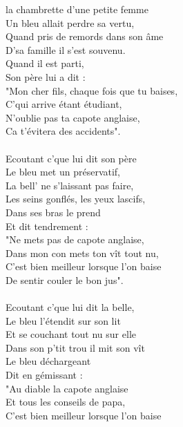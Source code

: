 
 la chambrette d'une petite femme
\\Un bleu allait perdre sa vertu,
\\Quand pris de remords dans son âme
\\D'sa famille il s'est souvenu.
\\Quand il est parti,
\\Son père lui a dit :
\\"Mon cher fils, chaque fois que tu baises,
\\C'qui arrive étant étudiant,
\\N'oublie pas ta capote anglaise,
\\Ca t'évitera des accidents".
\\\\Ecoutant c'que lui dit son père
\\Le bleu met un préservatif,
\\La bell' ne s'laissant pas faire,
\\Les seins gonflés, les yeux lascifs,
\\Dans ses bras le prend
\\Et dit tendrement :
\\"Ne mets pas de capote anglaise,
\\Dans mon con mets ton vît tout nu,
\\C'est bien meilleur lorsque l'on baise
\\De sentir couler le bon jus".
\\\\Ecoutant c'que lui dit la belle,
\\Le bleu l'étendit sur son lit
\\Et se couchant tout nu sur elle
\\Dans son p'tit trou il mit son vît
\\Le bleu déchargeant
\\Dit en gémissant :
\\"Au diable la capote anglaise
\\Et tous les conseils de papa,
\\C'est bien meilleur lorsque l'on baise
